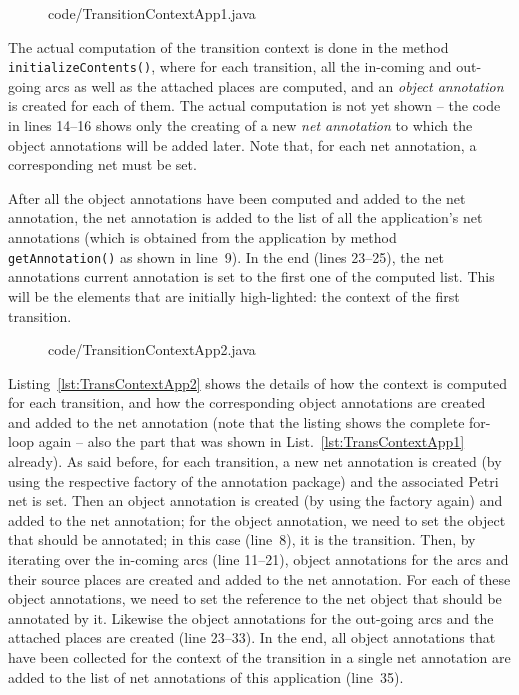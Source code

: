 \begin{figure}[htbp!]
%
  {code/TransitionContextApp1.java}
\end{figure}

%
%
The actual computation of the transition context is done in the method
{\tt initializeContents()}, where for each transition, all the in-coming
and out-going arcs as well as the attached places are computed, and
an \emph{object annotation} is created for each of them. The actual computation
is not yet shown -- the code in lines 14--16 shows only the creating of a 
new \emph{net annotation} to which the object annotations will be added later.
Note that, for each net annotation, a corresponding net must be set. 

After all the object annotations have been computed and added to the net
annotation, the net annotation is added to the list of all the application's net
annotations (which is obtained from the application by method {\tt
getAnnotation()} as shown in line~9). In the end (lines 23--25), the net
annotations current annotation is set to the first one of the computed list.
This will be the elements that are initially high-lighted: the context of the
first transition.
 
\begin{figure}[htbp!]
%
  {code/TransitionContextApp2.java}
\end{figure}
%
Listing~\ref{lst:TransContextApp2} shows the details of how the context 
is computed for each transition, and how the corresponding object annotations
are created and added to the net annotation (note that the listing shows
the complete for-loop again -- also the part that was shown in
List.~\ref{lst:TransContextApp1} already). As said before, for each transition,
a new net annotation is created (by using the respective factory of the
annotation package) and the associated Petri net is set. Then an object
annotation is created (by using the factory again) and added to the net
annotation; for the object annotation, we need to set the object that should be
annotated; in this case (line~8), it is the transition. Then, by iterating over
the in-coming arcs (line 11--21), object annotations for the arcs and their
source places are created and added to the net annotation. For each of these
object annotations, we need to set the reference to the net object that should
be annotated by it. Likewise the object annotations for the out-going arcs
and the attached places are created (line 23--33).
In the end, all object annotations that have been collected for the context of
the transition in a single net annotation are added to the list of net
annotations of this application (line~35).

